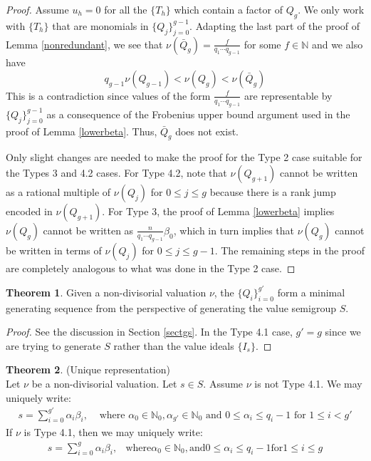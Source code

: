 \documentclass[11pt]{amsart}
\theoremstyle{definition}
\newtheorem{thm}{Theorem}[section]
\begin{document}
{\begin{proof}
Assume $u_h=0$ for all the $\{T_h\}$ which contain a factor of $Q_g$. We only work with $\{T_h\}$ that are monomials in $\{Q_j\}_{j=0}^{g-1}$. Adapting the last part of the proof of Lemma \ref{nonredundant}, we see that $\displaystyle \nu(\bar Q_g) = \frac{f}{q_1\cdots q_{g-1}}$ for some $f\in\mathbb{N}$ and we also have
\begin{equation*}
q_{g-1}\nu(Q_{g-1}) < \nu(Q_g) < \nu(\bar Q_g)
\end{equation*}
This is a contradiction since values of the form $\displaystyle \frac{f}{q_1\cdots q_{g-1}}$ are representable by $\{Q_j\}_{j=0}^{g-1}$ as a consequence of the Frobenius upper bound argument used in the proof of Lemma \ref{lowerbeta}. Thus, $\bar Q_g$ does not exist.

Only slight changes are needed to make the proof for the Type 2 case suitable for the Types 3 and 4.2 cases. For Type 4.2, note that $\nu(Q_{g+1})$ cannot be written as a rational multiple of $\nu(Q_j)$ for $0\leq j \leq g$ because there is a rank jump encoded in $\nu(Q_{g+1})$. For Type 3, the proof of Lemma \ref{lowerbeta} implies $\nu(Q_g)$ cannot be written as $\displaystyle \frac{n}{q_1\cdots q_{g-1}}\beta_0$, which in turn implies that $\nu(Q_g)$ cannot be written in terms of $\nu(Q_j)$ for $0\leq j \leq g-1$. The remaining steps in the proof are completely analogous to what was done in the Type 2 case.
\end{proof}

\begin{thm} \label{minimalgs}
Given a non-divisorial valuation $\nu$, the $\displaystyle \{Q_i\}_{i=0}^{g'}$ form a minimal generating sequence from the perspective of generating the value semigroup $S$.
\end{thm}
\begin{proof}
See the discussion in Section \ref{sectgs}. In the Type 4.1 case, $g'=g$ since we are trying to generate $S$ rather than the value ideals $\{I_s\}$.
\end{proof}

\begin{thm} \label{unique} (Unique representation)
\\
Let $\nu$ be a non-divisorial valuation. Let $s\in S$. Assume $\nu$ is not Type 4.1. We may uniquely write:
\begin{equation*}
\begin{array}{rll}
\displaystyle s=\sum_{i=0}^{g'} \alpha_i \beta_i, & \text{ where } \alpha_0\in\mathbb{N}_0, \alpha_{g'}\in\mathbb{N}_0 \text{ and } 0 \leq \alpha_i \leq q_i-1 \text{ for } 1\leq i < g'
\end{array}
\end{equation*}
If $\nu$ is Type 4.1, then we may uniquely write:
\begin{equation*}
\begin{array}{rll}
\displaystyle s=\sum_{i=0}^{g} \alpha_i \beta_i, & \text{where}\left.\right. \alpha_0\in\mathbb{N}_0, \left.\right.\text{and}\left.\right. 0 \leq \alpha_i \leq q_i-1 \left.\right.\text{for}\left.\right. 1\leq i \leq g
\end{array}
\end{equation*}
\end{thm}

}
\end{document}
